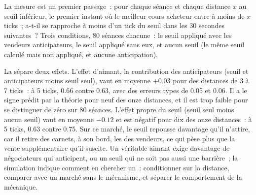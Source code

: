 La mesure est un premier passage~: pour chaque séance et chaque distance $x$ au seuil inférieur, le premier instant où le meilleur cours acheteur entre à moins de $x$ ticks~; a-t-il
se rapproche à moins d'un tick du seuil dans les 30 secondes suivantes~? Trois conditions, 80 séances chacune~: le seuil appliqué avec les vendeurs anticipateurs, le seuil
appliqué sans eux, et aucun seuil (le même seuil calculé mais non appliqué, et aucune anticipation).

\begin{omfigure}

\label{fig:mx:circuit-breakers-and-halts:passage}
\end{omfigure}

La  sépare deux effets. L'effet d'aimant, la contribution des anticipateurs (seuil et anticipateurs moins seuil
seul), vaut en moyenne $+0.03$ pour des distances de 3 à 7 ticks~: à 5 ticks, 0.66 contre 0.63, avec des erreurs types de 0.05 et 0.06. Il a le signe prédit par la théorie
pour neuf des onze distances, et il est trop faible pour se distinguer de zéro sur 80 séances. L'effet propre du seuil (seuil seul moins aucun seuil)
vaut en moyenne $-0.12$ et est négatif pour dix des onze distances~: à 5 ticks, 0.63 contre 0.75. Sur ce marché, le seuil repousse davantage qu'il n'attire, car il retire des carnets, à son bord, les  des vendeurs, ce qui
pèse plus que la vente supplémentaire qu'il suscite. Un véritable aimant exige davantage de négociateurs qui anticipent, ou un seuil qui ne soit pas aussi une barrière~; la simulation indique
comment en chercher un~: conditionner sur la distance, comparer avec un marché sans le mécanisme, et séparer le comportement de la mécanique.

